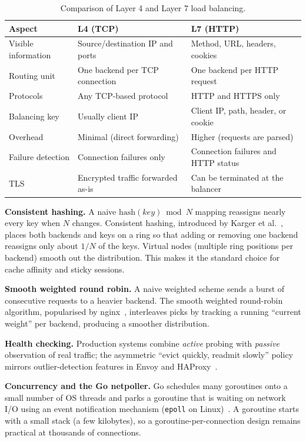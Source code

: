 \documentclass[11pt,a4paper]{report}
\newcommand{\code}[1]{\texttt{#1}}
\begin{document}
\begin{table}[htbp]
\centering
\caption{Comparison of Layer 4 and Layer 7 load balancing.}
\label{tab:l4l7}
\begin{tabular}{p{3cm}p{5cm}p{5cm}}
\toprule
\textbf{Aspect} & \textbf{L4 (TCP)} & \textbf{L7 (HTTP)}\\
\midrule
Visible information & Source/destination IP and ports & Method, URL, headers, cookies\\
Routing unit & One backend per TCP connection & One backend per HTTP request\\
Protocols & Any TCP-based protocol & HTTP and HTTPS only\\
Balancing key & Usually client IP & Client IP, path, header, or cookie\\
Overhead & Minimal (direct forwarding) & Higher (requests are parsed)\\
Failure detection & Connection failures only & Connection failures and HTTP status\\
TLS & Encrypted traffic forwarded as-is & Can be terminated at the balancer\\
\bottomrule
\end{tabular}
\end{table}

\textbf{Consistent hashing.} A naive $\text{hash}(key) \bmod N$ mapping reassigns nearly every
key when $N$ changes. Consistent hashing, introduced by Karger et al.~\cite{karger}, places
both backends and keys on a ring so that adding or removing one backend reassigns only about
$1/N$ of the keys. Virtual nodes (multiple ring positions per backend) smooth out the
distribution. This makes it the standard choice for cache affinity and sticky sessions.

\textbf{Smooth weighted round robin.} A naive weighted scheme sends a burst of consecutive
requests to a heavier backend. The smooth weighted round-robin algorithm, popularised by
nginx~\cite{nginx}, interleaves picks by tracking a running ``current weight'' per backend,
producing a smoother distribution.

\textbf{Health checking.} Production systems combine \emph{active} probing with \emph{passive}
observation of real traffic; the asymmetric ``evict quickly, readmit slowly'' policy mirrors
outlier-detection features in Envoy and HAProxy~\cite{envoy}.

\textbf{Concurrency and the Go netpoller.} Go schedules many goroutines onto a small number of
OS threads and parks a goroutine that is waiting on network I/O using an event notification
mechanism (\code{epoll} on Linux)~\cite{netpoll}. A goroutine starts with a small stack (a few
kilobytes), so a goroutine-per-connection design remains practical at thousands of
connections.
\end{document}
